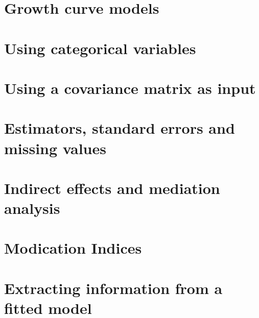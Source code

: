 \documentclass{article}
\begin{document}
\section{Growth curve models}

\section{Using categorical variables}

\section{Using a covariance matrix as input}

\section{Estimators, standard errors and missing values}

\section{Indirect effects and mediation analysis}

\section{Modication Indices}

\section{Extracting information from a fitted model}

\end{document}
